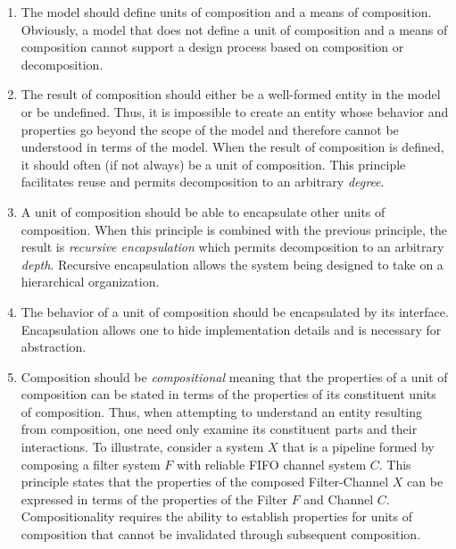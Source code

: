 \begin{enumerate}
\item The model should define units of composition and a means of composition.
Obviously, a model that does not define a unit of composition and a means of composition cannot support a design process based on composition or decomposition.

\item The result of composition should either be a well-formed entity in the model or be undefined.
Thus, it is impossible to create an entity whose behavior and properties go beyond the scope of the model and therefore cannot be understood in terms of the model.
When the result of composition is defined, it should often (if not always) be a unit of composition.
This principle facilitates reuse and permits decomposition to an arbitrary \emph{degree}.

\item A unit of composition should be able to encapsulate other units of composition.
When this principle is combined with the previous principle, the result is \emph{recursive encapsulation} which permits decomposition to an arbitrary \emph{depth}.
Recursive encapsulation allows the system being designed to take on a hierarchical organization.

\item The behavior of a unit of composition should be encapsulated by its interface.
Encapsulation allows one to hide implementation details and is necessary for abstraction.


\item Composition should be \emph{compositional} meaning that the properties of a unit of composition can be stated in terms of the properties of its constituent units of composition.
Thus, when attempting to understand an entity resulting from composition, one need only examine its constituent parts and their interactions.
To illustrate, consider a system $X$ that is a pipeline formed by composing a filter system $F$ with reliable FIFO channel system $C$.
This principle states that the properties of the composed Filter-Channel $X$ can be expressed in terms of the properties of the Filter $F$ and Channel $C$.
Compositionality requires the ability to establish properties for units of composition that cannot be invalidated through subsequent composition.


\end{enumerate}
